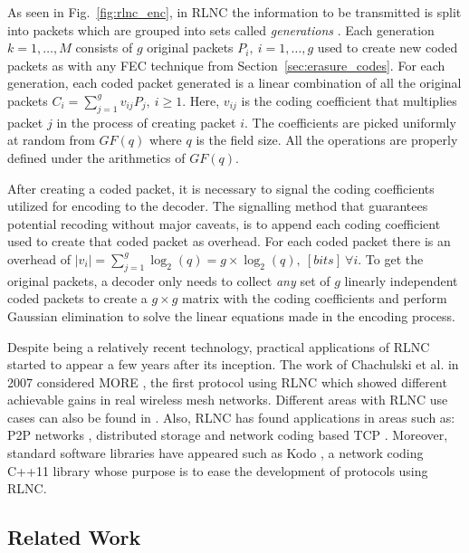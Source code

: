 As seen in Fig.~\ref{fig:rlnc_enc}, in \ac{RLNC} the information to be transmitted is split into packets which are grouped into sets called \textit{generations} \cite{chou2003practical}. Each generation $k = 1, \ldots, M$ consists of $g$ original packets $P_i,\ i = 1, \ldots, g$ used to create new coded packets as with any \ac{FEC} technique from Section~\ref{sec:erasure_codes}. For each generation, each coded packet generated is a linear combination of all the original packets $C_i = \sum_{j = 1}^g v_{ij} P_j,\ i \geq 1$. Here, $v_{ij}$ is the coding coefficient that multiplies packet $j$ in the process of creating packet $i$. The coefficients are picked uniformly at random from $GF(q)$ where $q$ is the field size. All the operations are properly defined under the arithmetics of $GF(q)$.

After creating a coded packet, it is necessary to signal the coding coefficients utilized for encoding to the decoder. The signalling method that guarantees potential recoding without major caveats, is to append each coding coefficient used to create that coded packet as overhead. For each coded packet there is an overhead of $|v_{i}| = \sum_{j = 1}^g \log_{2}(q) = g \times \log_{2}(q),\ [bits]\ \forall i$. To get the original packets, a decoder only needs to collect \textit{any} set of $g$ linearly independent coded packets to create a $g \times g$ matrix with the coding coefficients and perform Gaussian elimination \cite{fragouli2006network} to solve the linear equations made in the encoding process.

Despite being a relatively recent technology, practical applications of \ac{RLNC} started to appear a few years after its inception. The work of Chachulski et al. in 2007 considered \ac{MORE} \cite{chachulski2007more}, the first protocol using \ac{RLNC} which showed different achievable gains in real wireless mesh networks. Different areas with \ac{RLNC} use cases can also be found in \cite{fragouli2006network}. Also, \ac{RLNC} has found applications in areas such as: \ac{P2P} networks \cite{gkantsidis2005network}, distributed storage \cite{dimakis2010network} and network coding based \ac{TCP} \cite{kim2014modeling}. Moreover, standard software libraries have appeared such as Kodo \cite{kodo2011pedersen}, a network coding C++11 library whose purpose is to ease the development of protocols using \ac{RLNC}.

\subsection{Related Work}

